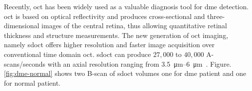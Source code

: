 Recently, \ac{oct} has been widely used as a valuable diagnosis tool for \ac{dme} detection.
\ac{oct} is based on optical reflectivity and produces cross-sectional and three-dimensional images of the central retina, thus allowing quantitative retinal thickness and structure measurements.
The new generation of \ac{oct} imaging, namely \ac{sdoct} offers higher resolution and faster image acquisition over conventional time domain \ac{oct}. \Ac{sdoct} can produce $27,000$ to $40,000$ A-scans/seconds with an axial resolution ranging from \SIrange{3.5}{6}{\micro \metre}~\cite{Chen2005}. 
Figure.\,\ref{fig:dme-normal} shows two B-scan of \ac{sdoct} volumes one for \ac{dme} patient and one for normal patient.
\begin{figure}
\begin{center}
\hspace*{\fill}
\hfill

\end{center}
\end{figure}
